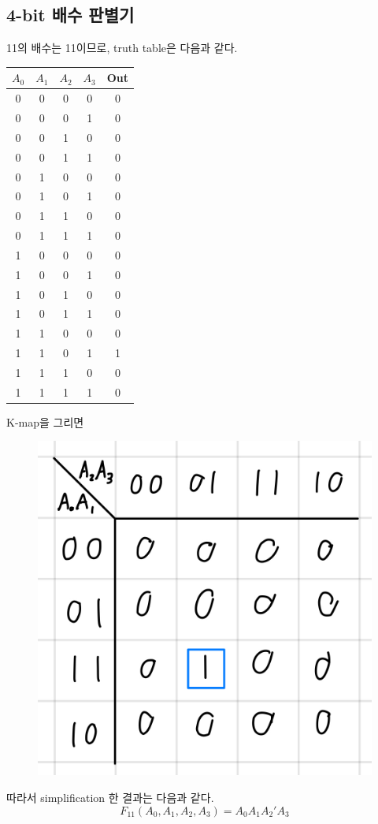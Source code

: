 \documentclass{scrartcl}
\begin{document}
\subsection{4-bit 배수 판별기}
11의 배수는 11이므로, truth table은 다음과 같다.
\begin{table}[H]
  \centering
  \begin{tabular}{|cccc|c|}
    \hline
    \(A_0\) & \(A_1\) & \(A_2\) & \(A_3\) & Out \\
    \hline
    0       & 0       & 0       & 0       & 0   \\
    0       & 0       & 0       & 1       & 0   \\
    0       & 0       & 1       & 0       & 0   \\
    0       & 0       & 1       & 1       & 0   \\
    0       & 1       & 0       & 0       & 0   \\
    0       & 1       & 0       & 1       & 0   \\
    0       & 1       & 1       & 0       & 0   \\
    0       & 1       & 1       & 1       & 0   \\
    1       & 0       & 0       & 0       & 0   \\
    1       & 0       & 0       & 1       & 0   \\
    1       & 0       & 1       & 0       & 0   \\
    1       & 0       & 1       & 1       & 0   \\
    1       & 1       & 0       & 0       & 0   \\
    1       & 1       & 0       & 1       & 1   \\
    1       & 1       & 1       & 0       & 0   \\
    1       & 1       & 1       & 1       & 0   \\
    \hline
  \end{tabular}
\end{table}
K-map을 그리면
\begin{figure}[H]
  \centering
  \includegraphics[width=0.3\linewidth]{lab3_2_11_km}
\end{figure}
따라서 simplification 한 결과는 다음과 같다.
\[
  F_{11}(A_0, A_1, A_2, A_3) = A_0 A_1 A_2' A_3
\]
\end{document}

